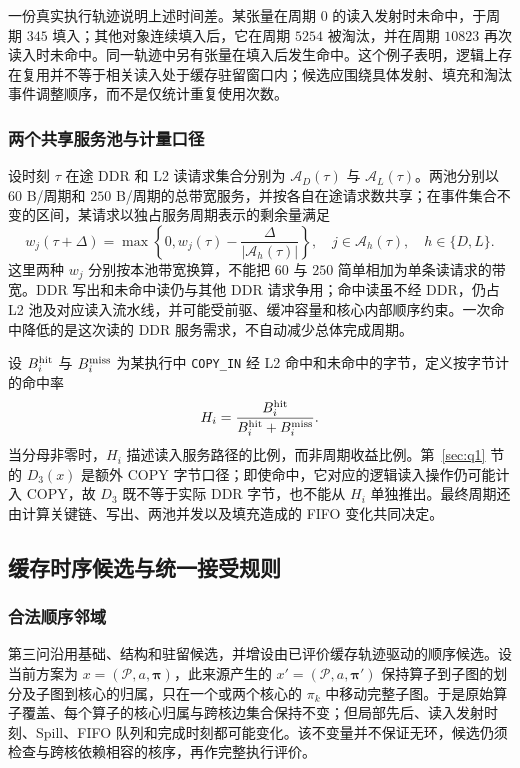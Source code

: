 一份真实执行轨迹说明上述时间差。某张量在周期 $0$ 的读入发射时未命中，于周期 $345$ 填入；其他对象连续填入后，它在周期 $5254$ 被淘汰，并在周期 $10823$ 再次读入时未命中。同一轨迹中另有张量在填入后发生命中。这个例子表明，逻辑上存在复用并不等于相关读入处于缓存驻留窗口内；候选应围绕具体发射、填充和淘汰事件调整顺序，而不是仅统计重复使用次数。

\subsubsection{两个共享服务池与计量口径}
设时刻 $\tau$ 在途 DDR 和 L2 读请求集合分别为 $\mathcal A_D(\tau)$ 与 $\mathcal A_L(\tau)$。两池分别以 $60$ B/周期和 $250$ B/周期的总带宽服务，并按各自在途请求数共享；在事件集合不变的区间，某请求以独占服务周期表示的剩余量满足
\begin{equation}
 w_j(\tau+\Delta)=
 \max\!\left\{0,w_j(\tau)-\frac{\Delta}{|\mathcal A_h(\tau)|}\right\},
 \quad j\in\mathcal A_h(\tau),\quad h\in\{D,L\}.
 \label{eq:q3_two_pools}
\end{equation}
这里两种 $w_j$ 分别按本池带宽换算，不能把 $60$ 与 $250$ 简单相加为单条读请求的带宽。DDR 写出和未命中读仍与其他 DDR 请求争用；命中读虽不经 DDR，仍占 L2 池及对应读入流水线，并可能受前驱、缓冲容量和核心内部顺序约束。一次命中降低的是这次读的 DDR 服务需求，不自动减少总体完成周期。

设 $B_i^{\rm hit}$ 与 $B_i^{\rm miss}$ 为某执行中 \texttt{COPY\_IN} 经 L2 命中和未命中的字节，定义按字节计的命中率
\begin{equation}
 H_i=\frac{B_i^{\rm hit}}{B_i^{\rm hit}+B_i^{\rm miss}}.
 \label{eq:q3_hit}
\end{equation}
当分母非零时，$H_i$ 描述读入服务路径的比例，而非周期收益比例。第~\ref{sec:q1} 节的 $D_3(x)$ 是额外 COPY 字节口径；即使命中，它对应的逻辑读入操作仍可能计入 COPY，故 $D_3$ 既不等于实际 DDR 字节，也不能从 $H_i$ 单独推出。最终周期还由计算关键链、写出、两池并发以及填充造成的 FIFO 变化共同决定。

\subsection{缓存时序候选与统一接受规则}
\subsubsection{合法顺序邻域}
第三问沿用基础、结构和驻留候选，并增设由已评价缓存轨迹驱动的顺序候选。设当前方案为 $x=(\mathcal P,a,\boldsymbol\pi)$，此来源产生的 $x'=(\mathcal P,a,\boldsymbol\pi')$ 保持算子到子图的划分及子图到核心的归属，只在一个或两个核心的 $\pi_k$ 中移动完整子图。于是原始算子覆盖、每个算子的核心归属与跨核边集合保持不变；但局部先后、读入发射时刻、Spill、FIFO 队列和完成时刻都可能变化。该不变量并不保证无环，候选仍须检查与跨核依赖相容的核序，再作完整执行评价。

